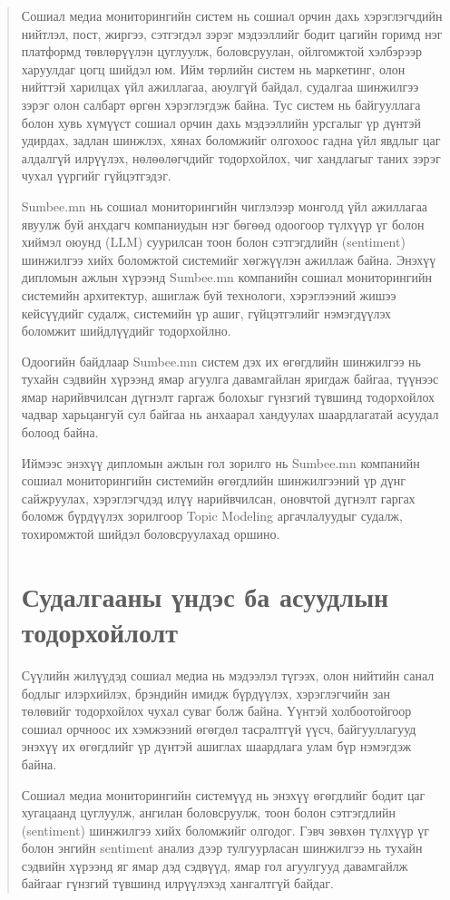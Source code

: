 \begin{abstract}
Сошиал медиа мониторингийн систем нь сошиал орчин дахь хэрэглэгчдийн нийтлэл, пост, жиргээ, сэтгэгдэл зэрэг мэдээллийг бодит цагийн горимд нэг платформд төвлөрүүлэн цуглуулж, боловсруулан, ойлгомжтой хэлбэрээр харуулдаг цогц шийдэл юм. Ийм төрлийн систем нь маркетинг, олон нийттэй харилцах үйл ажиллагаа, аюулгүй байдал, судалгаа шинжилгээ зэрэг олон салбарт өргөн хэрэглэгдэж байна. Тус систем нь байгууллага болон хувь хүмүүст сошиал орчин дахь мэдээллийн урсгалыг үр дүнтэй удирдах, задлан шинжлэх, хянах боломжийг олгохоос гадна үйл явдлыг цаг алдалгүй илрүүлэх, нөлөөлөгчдийг тодорхойлох, чиг хандлагыг таних зэрэг чухал үүргийг гүйцэтгэдэг.

Sumbee.mn нь сошиал мониторингийн чиглэлээр монголд үйл ажиллагаа явуулж буй анхдагч компаниудын нэг бөгөөд одоогоор түлхүүр үг болон хиймэл оюунд (LLM) суурилсан тоон болон сэтгэгдлийн (sentiment) шинжилгээ хийх боломжтой системийг хөгжүүлэн ажиллаж байна. Энэхүү дипломын ажлын хүрээнд Sumbee.mn компанийн сошиал мониторингийн системийн архитектур, ашиглаж буй технологи, хэрэглээний жишээ кейсүүдийг судалж, системийн үр ашиг, гүйцэтгэлийг нэмэгдүүлэх боломжит шийдлүүдийг тодорхойлно.

Одоогийн байдлаар Sumbee.mn систем дэх их өгөгдлийн шинжилгээ нь тухайн сэдвийн хүрээнд ямар агуулга давамгайлан яригдаж байгаа, түүнээс ямар нарийвчилсан дүгнэлт гаргаж болохыг гүнзгий түвшинд тодорхойлох чадвар харьцангуй сул байгаа нь анхаарал хандуулах шаардлагатай асуудал болоод байна.

Иймээс энэхүү дипломын ажлын гол зорилго нь Sumbee.mn компанийн сошиал мониторингийн системийн өгөгдлийн шинжилгээний үр дүнг сайжруулах, хэрэглэгчдэд илүү нарийвчилсан, оновчтой дүгнэлт гаргах боломж бүрдүүлэх зорилгоор Topic Modeling аргачлалуудыг судалж, тохиромжтой шийдэл боловсруулахад оршино.

\section{Судалгааны үндэс ба асуудлын тодорхойлолт}
Сүүлийн жилүүдэд сошиал медиа нь мэдээлэл түгээх, олон нийтийн санал бодлыг илэрхийлэх, брэндийн имидж бүрдүүлэх, хэрэглэгчийн зан төлөвийг тодорхойлох чухал суваг болж байна. Үүнтэй холбоотойгоор сошиал орчноос их хэмжээний өгөгдөл тасралтгүй үүсч, байгууллагууд энэхүү их өгөгдлийг үр дүнтэй ашиглах шаардлага улам бүр нэмэгдэж байна.

Сошиал медиа мониторингийн системүүд нь энэхүү өгөгдлийг бодит цаг хугацаанд цуглуулж, ангилан боловсруулж, тоон болон сэтгэгдлийн (sentiment) шинжилгээ хийх боломжийг олгодог. Гэвч зөвхөн түлхүүр үг болон энгийн sentiment анализ дээр тулгуурласан шинжилгээ нь тухайн сэдвийн хүрээнд яг ямар дэд сэдвүүд, ямар гол агуулгууд давамгайлж байгааг гүнзгий түвшинд илрүүлэхэд хангалтгүй байдаг.


\end{abstract}

